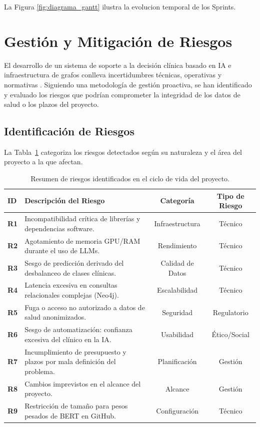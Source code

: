 \documentclass[12pt,a4paper,onecolumn,oneside]{report}
\begin{document}
La Figura \ref{fig:diagrama_gantt} ilustra la evolucion temporal de los Sprints.

\section{Gestión y Mitigación de Riesgos}

El desarrollo de un sistema de soporte a la decisión clínica basado en IA e infraestructura de grafos conlleva incertidumbres técnicas, operativas y normativas \cite{Kraguljac}. Siguiendo una metodología de gestión proactiva, se han identificado y evaluado los riesgos que podrían comprometer la integridad de los datos de salud o los plazos del proyecto.

\subsection{Identificación de Riesgos}

La Tabla~\ref{tab:resumen_riesgos} categoriza los riesgos detectados según su naturaleza y el área del proyecto a la que afectan.

\begin{table}[htbp]
\centering
\small
\renewcommand{\arraystretch}{1.3}
\begin{tabular}{|l|p{6.5cm}|c|c|}
\hline
\rowcolor[RGB]{239,239,239}
\textbf{ID} & \textbf{Descripción del Riesgo} & \textbf{Categoría} & \textbf{Tipo de Riesgo} \\ \hline
\textbf{R1} & Incompatibilidad crítica de librerías y dependencias software. & Infraestructura & Técnico \\ \hline
\textbf{R2} & Agotamiento de memoria GPU/RAM durante el uso de LLMs. & Rendimiento & Técnico \\ \hline
\textbf{R3} & Sesgo de predicción derivado del desbalanceo de clases clínicas. & Calidad de Datos & Técnico \\ \hline
\textbf{R4} & Latencia excesiva en consultas relacionales complejas (Neo4j). & Escalabilidad & Técnico \\ \hline
\textbf{R5} & Fuga o acceso no autorizado a datos de salud anonimizados. & Seguridad & Regulatorio \\ \hline
\textbf{R6} & Sesgo de automatización: confianza excesiva del clínico en la IA. & Usabilidad & Ético/Social \\ \hline
\textbf{R7} & Incumplimiento de presupuesto y plazos por mala definición del problema. & Planificación & Gestión \\ \hline
\textbf{R8} & Cambios imprevistos en el alcance del proyecto. & Alcance & Gestión \\ \hline
\textbf{R9} & Restricción de tamaño para pesos pesados de BERT en GitHub. & Configuración & Técnico \\ \hline
\end{tabular}
\caption{Resumen de riesgos identificados en el ciclo de vida del proyecto.}
\label{tab:resumen_riesgos}
\end{table}
\clearpage
\end{document}
